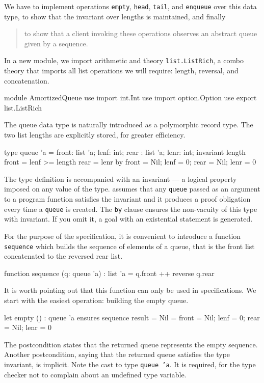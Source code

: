 We have to implement operations \texttt{empty}, \texttt{head},
\texttt{tail}, and \texttt{enqueue} over this data type,
to show that the invariant over lengths is maintained, and finally
\begin{quote}
  to show that a client invoking these operations
  observes an abstract queue given by a sequence.
\end{quote}
In a new module, we import arithmetic and theory
\texttt{list.ListRich}, a combo theory that imports all list
operations we will require: length, reversal, and concatenation.
\begin{whycode}
module AmortizedQueue
  use import int.Int
  use import option.Option
  use export list.ListRich
\end{whycode}
The queue data type is naturally introduced as a polymorphic record type.
The two list lengths are explicitly stored, for greater efficiency.
\begin{whycode}
  type queue 'a = { front: list 'a; lenf: int;
                    rear : list 'a; lenr: int; }
  invariant { length front = lenf >= length rear = lenr }
  by { front = Nil; lenf = 0; rear = Nil; lenr = 0 }
\end{whycode}
The type definition is accompanied with an invariant ---
a logical property imposed on any value of the type.
\why assumes that any \texttt{queue} passed as an argument to
a program function satisfies the invariant and it produces
a proof obligation every time a \texttt{queue} is created.
The \texttt{by} clause ensures the non-vacuity of this type with
invariant. If you omit it, a goal with an existential statement is generated.

For the purpose of the specification, it is convenient to introduce a function
\texttt{sequence} which builds the sequence of elements of a queue, that
is the front list concatenated to the reversed rear list.
\begin{whycode}
  function sequence (q: queue 'a) : list 'a = q.front ++ reverse q.rear
\end{whycode}
It is worth pointing out that this function can only be used in
specifications.
We start with the easiest operation: building the empty queue.
\begin{whycode}
  let empty () : queue 'a
    ensures { sequence result = Nil }
  = { front = Nil; lenf = 0; rear = Nil; lenr = 0 }
\end{whycode}
The postcondition states that the returned queue represents
the empty sequence. Another postcondition, saying that the
returned queue satisfies the type invariant, is implicit.
Note the cast to type \texttt{queue 'a}. It is required, for the
type checker not to complain about an undefined type variable.

